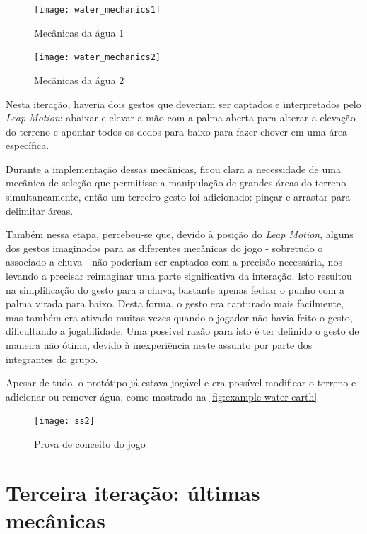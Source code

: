 \begin{figure}[ht]
	\centering
	\caption{Mecânicas da água 1}
	\texttt{[image: water\_mechanics1]}
	\legend{\fonteAP}
	\label{fig:mecanica-agua-enchendo-graficamente}
\end{figure}

\begin{figure}[ht]
	\centering
	\caption{Mecânicas da água 2}
	\texttt{[image: water\_mechanics2]}
	\legend{\fonteAP}
	\label{fig:mecanica-agua-enchendo-mecanica}
\end{figure}

Nesta iteração, haveria dois gestos que deveriam ser captados e interpretados 
pelo \textit{Leap Motion}: abaixar e elevar a mão com a palma aberta para alterar 
a elevação do terreno e apontar todos os dedos para baixo para fazer chover em 
uma área específica.

Durante a implementação dessas mecânicas, ficou clara a necessidade de uma 
mecânica de seleção que permitisse a manipulação de grandes áreas do terreno
simultaneamente, então um terceiro gesto foi adicionado: pinçar e arrastar 
para delimitar áreas.

Também nessa etapa, percebeu-se que, devido à posição do \textit{Leap Motion},
alguns dos gestos imaginados para as diferentes mecânicas do jogo - sobretudo 
o associado a chuva - não poderiam ser captados com a precisão necessária, 
nos levando a precisar reimaginar uma parte significativa da interação. Isto 
resultou na simplificação do gesto para a chuva, bastante apenas fechar o punho
com a palma virada para baixo. Desta forma, o gesto era capturado mais facilmente,
mas também era ativado muitas vezes quando o jogador não havia feito o gesto, 
dificultando a jogabilidade. Uma possível razão para isto é ter definido o 
gesto de maneira não ótima, devido à inexperiência neste assunto por parte
dos integrantes do grupo.

Apesar de tudo, o protótipo já estava jogável e era possível modificar o terreno e adicionar ou remover água, como mostrado na \autoref{fig:example-water-earth}

\begin{figure}[ht]
	\centering
	\caption{Prova de conceito do jogo}
	\texttt{[image: ss2]}
	\legend{\fonteAP}
	\label{fig:example-water-earth}
\end{figure}

\section{Terceira iteração: últimas mecânicas}\label{sec-terceira-iteracao-ultimas-mecanicas}


